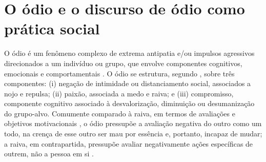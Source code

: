 \documentclass[portuguese]{textolivre}
\begin{document}
\section{O ódio e o discurso de ódio como prática social}

O ódio é um fenômeno complexo de extrema antipatia e/ou impulsos agressivos direcionados a um indivíduo ou grupo, que envolve componentes cognitivos, emocionais e comportamentais \cite{sternberg2005}. O ódio se estrutura, segundo \textcite{sternberg2005}, sobre três componentes: (i) negação de intimidade ou distanciamento social, associados a nojo e repulsa; (ii) paixão, associada a medo e raiva; e (iii) compromisso, componente cognitivo associado à desvalorização, diminuição ou desumanização do grupo-alvo. Comumente comparado à raiva, em termos de avaliações e objetivos motivacionais \cite{allport1979nature}, o ódio pressupõe a avaliação negativa do outro como um todo, na crença de esse outro ser mau por essência e, portanto, incapaz de mudar; a raiva, em contrapartida, pressupõe avaliar negativamente ações específicas de outrem, não a pessoa em si \cite{dijk2016schadenfreude}.
\end{document}
